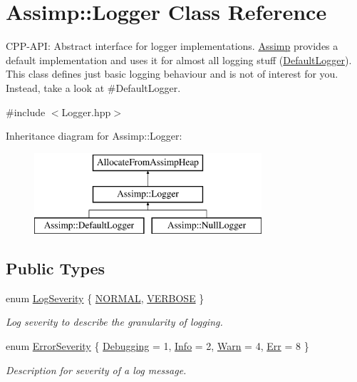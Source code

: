 \hypertarget{class_assimp_1_1_logger}{}\section{Assimp\+:\+:Logger Class Reference}
\label{class_assimp_1_1_logger}


C\+P\+P-\/\+A\+PI\+: Abstract interface for logger implementations. \hyperlink{namespace_assimp}{Assimp} provides a default implementation and uses it for almost all logging stuff (\textquotesingle{}\hyperlink{class_assimp_1_1_default_logger}{Default\+Logger}\textquotesingle{}). This class defines just basic logging behaviour and is not of interest for you. Instead, take a look at \#\+Default\+Logger.  




{\ttfamily \#include $<$Logger.\+hpp$>$}

Inheritance diagram for Assimp\+:\+:Logger\+:\begin{figure}[H]
\begin{center}
\leavevmode
\includegraphics[height=3.000000cm]{class_assimp_1_1_logger}
\end{center}
\end{figure}
\subsection*{Public Types}
\begin{DoxyCompactItemize}
\item 
enum \hyperlink{class_assimp_1_1_logger_a8b6248a0fd062431e8572556350d29e6}{Log\+Severity} \{ \hyperlink{class_assimp_1_1_logger_a8b6248a0fd062431e8572556350d29e6a79d16f85dc21486ee489f300027e8eda}{N\+O\+R\+M\+AL}, 
\hyperlink{class_assimp_1_1_logger_a8b6248a0fd062431e8572556350d29e6afc9d1d86aa82fdb80e00c99b3c1ce486}{V\+E\+R\+B\+O\+SE}
 \}\begin{DoxyCompactList}\small\item\em Log severity to describe the granularity of logging. \end{DoxyCompactList}
\item 
enum \hyperlink{class_assimp_1_1_logger_acd0b52a87d6fc11e957ed2c6e2ad75b6}{Error\+Severity} \{ \hyperlink{class_assimp_1_1_logger_acd0b52a87d6fc11e957ed2c6e2ad75b6a0cb475014d27098c3423738c571d857f}{Debugging} = 1, 
\hyperlink{class_assimp_1_1_logger_acd0b52a87d6fc11e957ed2c6e2ad75b6aa3377a574928b86f7de55c5df154f461}{Info} = 2, 
\hyperlink{class_assimp_1_1_logger_acd0b52a87d6fc11e957ed2c6e2ad75b6a1279c77aaee5a3d7df835a9b9305a697}{Warn} = 4, 
\hyperlink{class_assimp_1_1_logger_acd0b52a87d6fc11e957ed2c6e2ad75b6a71054d0b1323abcea46d050d69013d27}{Err} = 8
 \}\begin{DoxyCompactList}\small\item\em Description for severity of a log message. \end{DoxyCompactList}
\end{DoxyCompactItemize}
